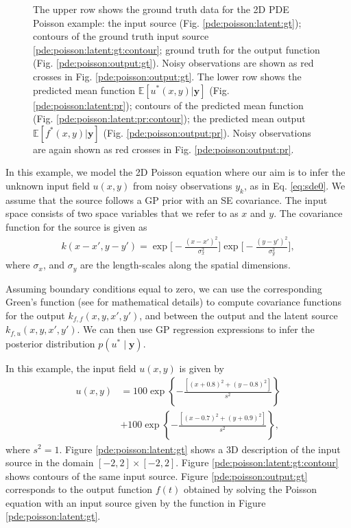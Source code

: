 \documentclass[journal]{IEEEtran}
\begin{document}
\begin{figure}[!ht]
     \caption{The upper row shows the ground truth data for the 2D PDE Poisson example: the input source
       (Fig. \ref{pde:poisson:latent:gt}); contours of the ground truth input source
       \ref{pde:poisson:latent:gt:contour}; ground truth for the output function
       (Fig. \ref{pde:poisson:output:gt}). Noisy observations are shown as red crosses in
       Fig. \ref{pde:poisson:output:gt}. The lower row shows the predicted mean function
       $\mathbb{E}[u^*(x,y)|\mathbf{y}]$ (Fig. \ref{pde:poisson:latent:pr}); contours of the predicted mean function
       (Fig. \ref{pde:poisson:latent:pr:contour}); the predicted mean output $\mathbb{E}[f^*(x,y)|\mathbf{y}]$ 
      (Fig. \ref{pde:poisson:output:pr}). Noisy observations are again shown as red crosses in Fig. \ref{pde:poisson:output:pr}. 
     }
     \label{fig:dummy}
   \end{figure}



In this example, we model the 2D Poisson equation where our aim is to infer the unknown input field $u(x,y)$ from noisy
observations $y_k$, as in Eq. \eqref{eq:sde0}. We assume that the source follows
a GP prior with an SE covariance. The input space consists of two space variables that we refer to as $x$
and $y$. The covariance function for the source is given as
\begin{align*}
k(x-x', y -y') = \exp\Bigg[-\frac{(x-x')^2}{\sigma^2_x}\Bigg]\exp\Bigg[-\frac{(y-y')^2}{\sigma^2_y}\Bigg],
\end{align*}
where $\sigma_x$, and $\sigma_y$ are the length-scales along the
spatial dimensions.

Assuming boundary conditions equal to zero, we can use the corresponding Green's function (see
\cite{Polyanin:Handbook02} for mathematical details) to compute covariance functions for the output
$k_{f,f}(x,y,x',y')$, and between the output and the latent source $k_{f,u}(x,y,x',y')$. We can then use GP regression
expressions to infer the posterior distribution $p(u^* \mid \mathbf{y})$.

In this example, the input field $u(x,y)$ is given by
\begin{align*}
u(x, y) & = 100\exp\left\{- \frac{\left[(x + 0.8)^2 + (y - 0.8)^2\right]}{s^2}\right\} \\
         & + 100\exp\left\{- \frac{\left[(x - 0.7)^2 + (y + 0.9)^2\right]}{s^2}\right\},
\end{align*}
where $s^2 = 1$.
Figure \ref{pde:poisson:latent:gt} shows a 3D description of the input source in the domain $[-2, 2]\times
[-2,2]$. Figure \ref{pde:poisson:latent:gt:contour} shows contours of the same input source. Figure
\ref{pde:poisson:output:gt} corresponds to the output function $f(t)$ obtained by solving the Poisson equation with an
input source given by the function in Figure \ref{pde:poisson:latent:gt}.
\end{document}
